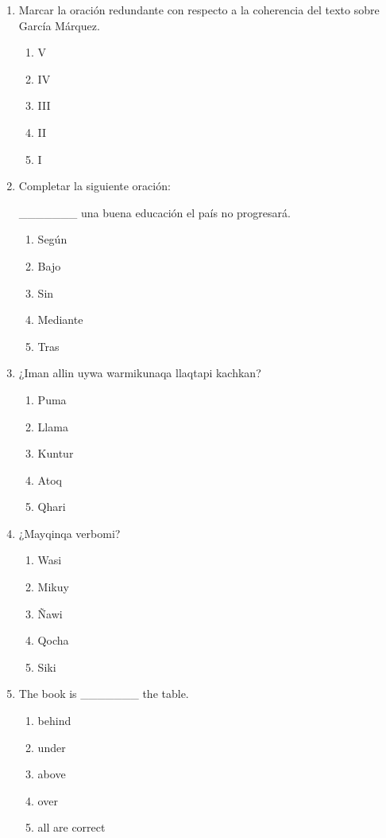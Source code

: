 \begin{enumerate}
	\item Marcar la oración redundante con respecto a la coherencia del texto sobre García Márquez.
	\begin{enumerate}[label=\alph*)]
		\item V
		\item IV
		\item III
		\item II
		\item I
	\end{enumerate}

	\item Completar la siguiente oración:

	\_\_\_\_\_\_\_ una buena educación el país no progresará.

	\begin{enumerate}[label=\alph*)]
		\item Según
		\item Bajo
		\item Sin
		\item Mediante
		\item Tras
	\end{enumerate}

	\item ¿Iman allin uywa warmikunaqa llaqtapi kachkan?
	\begin{enumerate}[label=\alph*)]
		\item Puma
		\item Llama
		\item Kuntur
		\item Atoq
		\item Qhari
	\end{enumerate}

	\item ¿Mayqinqa verbomi?
	\begin{enumerate}[label=\alph*)]
		\item Wasi
		\item Mikuy
		\item Ñawi
		\item Qocha
		\item Siki
	\end{enumerate}



	\item The book is \_\_\_\_\_\_\_ the table.
	\begin{enumerate}[label=\alph*)]
		\item behind
		\item under
		\item above
		\item over
		\item all are correct
	\end{enumerate}


\end{enumerate}

